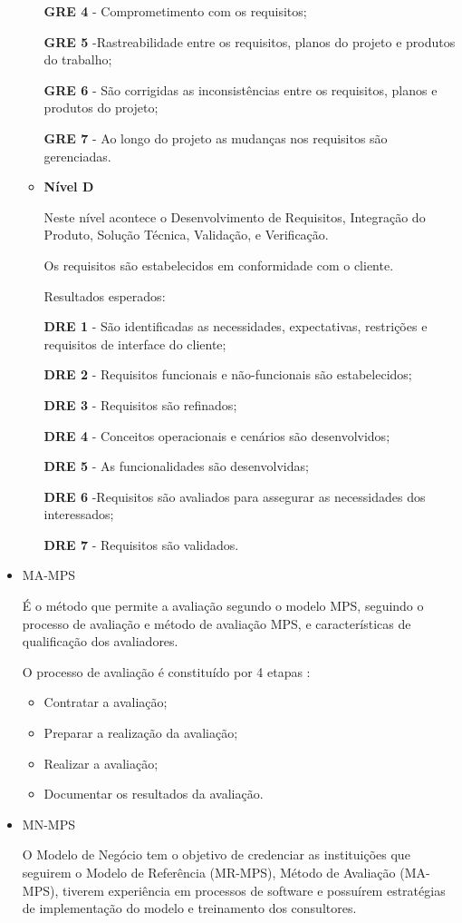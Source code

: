 \begin{itemize}
\begin{itemize}
\textbf{GRE 4} - Comprometimento com os requisitos;

\textbf{GRE 5} -Rastreabilidade entre os requisitos, planos do projeto e produtos do trabalho;

\textbf{GRE 6} - São corrigidas as inconsistências entre os requisitos, planos e produtos do projeto;

\textbf{GRE 7} - Ao longo do projeto as mudanças nos requisitos são gerenciadas.

\item\textbf{Nível D}

Neste nível acontece o Desenvolvimento de Requisitos, Integração do Produto, Solução Técnica, Validação, e Verificação. \cite {softex}

Os requisitos são estabelecidos em conformidade com o cliente.

Resultados esperados:

\textbf{DRE 1} - São identificadas as necessidades, expectativas, restrições e requisitos de interface do cliente;

\textbf{DRE 2} - Requisitos funcionais e não-funcionais são estabelecidos;

\textbf{DRE 3} - Requisitos são refinados;

\textbf{DRE 4} - Conceitos operacionais e cenários são desenvolvidos;

\textbf{DRE 5} - As funcionalidades são desenvolvidas;

\textbf{DRE 6} -Requisitos são avaliados para assegurar as necessidades dos interessados;

\textbf{DRE 7} - Requisitos são validados.

\end{itemize}

\item {MA-MPS}

É o método que permite a avaliação segundo o modelo MPS, seguindo o processo de avaliação e método de avaliação MPS, e características de qualificação dos avaliadores. \cite{Silveira}

O processo de avaliação é constituído por 4 etapas :

\begin{itemize}
\item Contratar a avaliação;
\item Preparar a realização da avaliação;
\item Realizar a avaliação;
\item Documentar os resultados da avaliação.
\end{itemize}

\item {MN-MPS}

O Modelo de Negócio tem o objetivo de credenciar as instituições que seguirem o Modelo de Referência (MR-MPS), Método de Avaliação (MA-MPS), tiverem experiência em processos de software e possuírem estratégias de implementação do modelo e treinamento dos consultores. \cite{Silveira}

\end{itemize}

